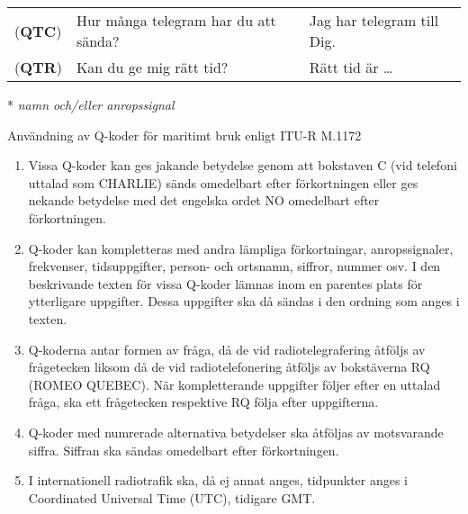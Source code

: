 \begin{table*}
\begin{threeparttable}
\begin{tabular}{lp{6cm}p{6cm}}
    (\textbf{QTC}) & Hur många telegram har du att sända? & Jag har telegram till Dig. \\
    (\textbf{QTR}) & Kan du ge mig rätt tid? & Rätt tid är \dots \\
  \end{tabular}
  \vspace{1em}
  \begin{tablenotes}
  \item [*] \emph{namn och/eller anropssignal}
  \end{tablenotes}
  \end{threeparttable}
\end{table*}

Användning av Q-koder för maritimt bruk enligt ITU-R M.1172
\begin{enumerate}
	\item Vissa Q-koder kan ges jakande betydelse genom att bokstaven C
	(vid telefoni uttalad som CHARLIE) sänds omedelbart efter
	förkortningen eller ges nekande betydelse med det engelska ordet NO
	omedelbart efter förkortningen.
	\item Q-koder kan kompletteras med andra lämpliga förkortningar,
	anropssignaler, frekvenser, tidsuppgifter, person- och ortsnamn,
	siffror, nummer osv. I den beskrivande texten för vissa Q-koder
	lämnas inom en parentes plats för ytterligare uppgifter. Dessa
	uppgifter ska då sändas i den ordning som anges i texten.
	\item Q-koderna antar formen av fråga, då de vid radiotelegrafering
	åtföljs av frågetecken liksom då de vid radiotelefonering åtföljs av
	bokstäverna RQ (ROMEO QUEBEC). När kompletterande uppgifter följer
	efter en uttalad fråga, ska ett frågetecken respektive RQ följa
	efter uppgifterna.
	\item Q-koder med numrerade alternativa betydelser ska åtföljas av
	motsvarande siffra. Siffran ska sändas omedelbart efter
	förkortningen.
	\item I internationell radiotrafik ska, då ej annat anges,
	tidpunkter anges i Coordinated Universal Time (UTC), tidigare GMT.
\end{enumerate}
